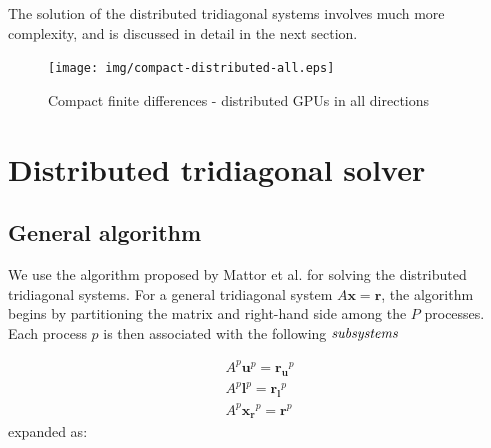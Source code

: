 The solution of the distributed tridiagonal systems
involves much more complexity,
and is discussed in detail in the next section.

\begin{figure}
\begin{center}
\texttt{[image: img/compact-distributed-all.eps]}
\caption{Compact finite differences - distributed GPUs in all
    directions}
\label{fig:compact-distributed-all}
\end{center}
\end{figure}

\section{Distributed tridiagonal solver}

\subsection{General algorithm}
\label{subsec:distributed-tridiagonal-algorithm}

We use the algorithm
proposed by Mattor et al. \cite{mattor1995algorithm}
for solving the distributed tridiagonal systems.
For a general tridiagonal system $A\bm{x}=\bm{r}$,
the algorithm begins by partitioning
the matrix and right-hand side among the $P$ processes.
Each process $p$ is then associated with the
following $\emph{subsystems}$

\begin{align}
    & A^p\bm{u}^p = \bm{r_u}^p & \label{eqn:secondary-system-1} \\ 
    & A^p\bm{l}^p = \bm{r_l}^p & \label{eqn:secondary-system-2} \\
    & A^p\bm{x_r}^p = \bm{r}^p & \label{eqn:primary-system} 
\end{align}
%
expanded as:

